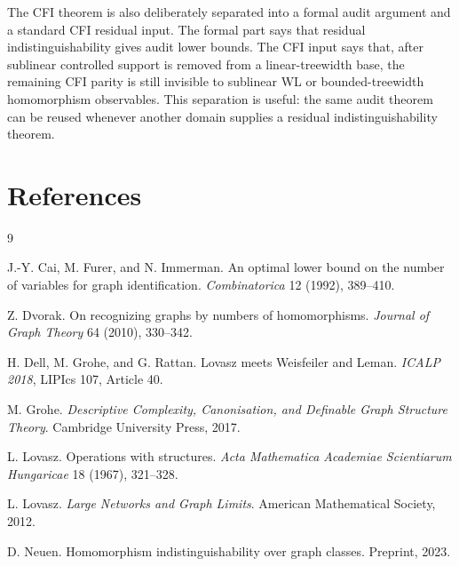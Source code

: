\documentclass[11pt]{article}
\theoremstyle{definition}
\begin{document}
The CFI theorem is also deliberately separated into a formal audit argument and a standard CFI residual input. The formal part says that residual indistinguishability gives audit lower bounds. The CFI input says that, after sublinear controlled support is removed from a linear-treewidth base, the remaining CFI parity is still invisible to sublinear WL or bounded-treewidth homomorphism observables. This separation is useful: the same audit theorem can be reused whenever another domain supplies a residual indistinguishability theorem.

\section*{References}

\begin{thebibliography}{9}

J.-Y. Cai, M. Furer, and N. Immerman.
\newblock An optimal lower bound on the number of variables for graph identification.
\newblock \emph{Combinatorica} 12 (1992), 389--410.

Z. Dvorak.
\newblock On recognizing graphs by numbers of homomorphisms.
\newblock \emph{Journal of Graph Theory} 64 (2010), 330--342.

H. Dell, M. Grohe, and G. Rattan.
\newblock Lovasz meets Weisfeiler and Leman.
\newblock \emph{ICALP 2018}, LIPIcs 107, Article 40.

M. Grohe.
\newblock \emph{Descriptive Complexity, Canonisation, and Definable Graph Structure Theory}.
\newblock Cambridge University Press, 2017.

L. Lovasz.
\newblock Operations with structures.
\newblock \emph{Acta Mathematica Academiae Scientiarum Hungaricae} 18 (1967), 321--328.

L. Lovasz.
\newblock \emph{Large Networks and Graph Limits}.
\newblock American Mathematical Society, 2012.

D. Neuen.
\newblock Homomorphism indistinguishability over graph classes.
\newblock Preprint, 2023.

\end{thebibliography}
\end{document}
